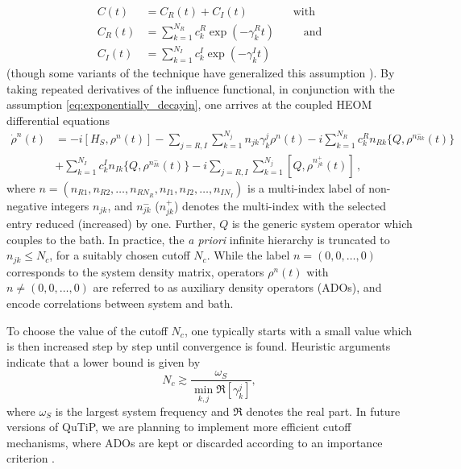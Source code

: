 \documentclass[preprint,3p,sort&compress]{elsarticle}
\begin{document}
\begin{subequations}
\begin{align}
      C(t)&= C_{R}(t)+ C_{I}(t) \qquad \qquad\text{with} \\ C_{R}(t) &=  \sum_{k=1}^{N_{R}} c_{k}^{R} \exp(-\gamma_{k}^{R} t) \qquad \; \;\text{and}  \\
      C_{I}(t)&= \sum_{k=1}^{N_{I}} c_{k}^{I} \exp(-\gamma_{k}^{I} t)
\end{align}\label{eq:exponentially_decayin}
\end{subequations}
(though some variants of the technique have generalized this assumption \cite{Rahman_Kleinekathöfer_2019}).
By taking repeated derivatives of the influence functional, in conjunction with the assumption \eqref{eq:exponentially_decayin}, one arrives at the  coupled HEOM differential equations
%
\begin{align}
    \dot{\rho}^{n}(t) &=  -i [H_{S},\rho^{n}(t) ]  - \sum_{j=R,I}\sum_{k=1}^{N_{j}} n_{jk} \gamma_{k}^{j} \rho^{n}(t) - i \sum_{k=1}^{N_{R}} c_{k}^{R} n_{Rk} \{Q, \rho^{n_{Rk}^-}(t)\} \nonumber \\  &+ \sum_{k=1}^{N_{I}} c_{k}^{I} n_{Ik}\{Q, \rho^{n_{Ik}^-}(t)\}  - i  \sum_{j=R,I}\sum_{k=1}^{N_{j}} [Q,\rho^{n_{jk}^+}(t)]\, ,
\end{align}
%
where $n=(n_{R1},n_{R2},\hdots ,n_{R N_{R}},n_{I1},n_{I2},\hdots,n_{I N_{I}})$  is a multi-index label of non-negative integers $n_{jk}$, and $n_{jk}^-$ ($n_{jk}^+$) denotes the multi-index with the selected entry reduced (increased) by one. Further, $Q$ is the generic system operator which couples to the bath. In practice, the \emph{a priori} infinite hierarchy is truncated to $n_{jk} \leq N_{c}$, for a suitably chosen cutoff $N_{c}$. While the label $n=(0,0,\hdots,0)$ corresponds to the system density matrix, operators $\rho^n(t)$ with $n \neq (0,0,\hdots,0)$  are referred to as auxiliary density operators (ADOs), and encode correlations between system and bath.

To choose the value of the cutoff $N_c$, one typically starts with a small value which is then increased step by step until convergence is found. Heuristic arguments indicate that a lower bound is given by \cite{IshizakiProcNatlAcadSci2009}
\begin{equation}
    N_c \gtrsim \frac{\omega_S}{\min_{k,j} \Re[\gamma_k^j]} ,
\end{equation}
where $\omega_S$ is the largest system frequency and $\Re$ denotes the real part.
In future versions of QuTiP, we are planning to implement more efficient cutoff mechanisms, where ADOs are kept or discarded according to an importance criterion \cite{PhysRevB.88.235426, PhysRevB.94.121303, Huang2023}.
\end{document}
